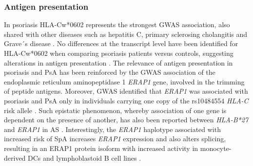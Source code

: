 


\subsubsection*{Antigen presentation}
In psoriasis HLA-Cw*0602  represents the strongest GWAS association, also shared with other diseases such as hepatitis C, primary sclerosing cholangitis and Grave´s disease \parencite{Blais2011}. No differences at the transcript level have been identified for HLA-Cw*0602 when comparing psoriasis patients versus controls, suggesting alterations in antigen presentation  \parencite{Hundhausen2012}. The relevance of antigen presentation in psoriasis and PsA has been reinforced by the GWAS association of the endoplasmic reticulum aminopeptidase 1 \textit{ERAP1} gene, involved in the trimming of peptide antigens. Moreover, GWAS identified that \textit{ERAP1} was associated with psoriasis and PsA only in individuals carrying one copy of the rs10484554 \textit{HLA-C} risk allele \parencite{Strange2010}. %
Such epistatic phenomenon, whereby association of one gene is dependent on the presence of another, has also been reported between \textit{HLA-B*27} and \textit{ERAP1} in AS \parencite{Evans2011, Cortes2015}. Interestingly, the \textit{ERAP1} haplotype associated with increased risk of SpA increases \textit{ERAP1} expression and also alters splicing, resulting in an ERAP1 protein isoform with increased activity in monocyte-derived DCs and lymphoblastoid B cell lines \parencite{Costantino2015, Hanson2018}.%


